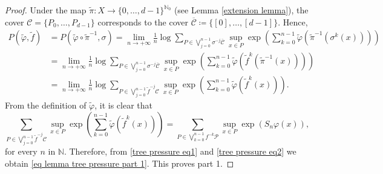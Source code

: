 \documentclass[12pt]{amsart}
\numberwithin{equation}{section} %
\numberwithin{figure}{section} %
\theoremstyle{plain}
\theoremstyle{definition}
\theoremstyle{remark}
\theoremstyle{citing}
\newcommand{\N}{\mathbb{N}}
\renewcommand{\=}{\coloneqq}
\begin{document}
\begin{proof}
    Under the map $\widetilde{\pi}: X\to\{0,\dots,d-1\}^{\N_0}$ (see Lemma \ref{extension lemma}), the cover $\mathcal{C}=\{P_0,\ldots,P_{d-1}\}$ corresponds to the cover $\overline{\mathcal{C}}\=\{[0],\ldots, [d-1]\}$. 
Hence,
\begin{equation}\label{tree pressure eq2}
\begin{split}
    P(\widetilde{\varphi},\widetilde{f}) &= P(\widetilde{\varphi}\circ \widetilde{\pi}^{-1},\sigma ) = \lim_{n\to+\infty}\frac{1}{n}\log \sum_{P\in \bigvee_{j=0}^{n-1}\sigma^{-j}\overline{\mathcal{C}}} \sup_{x\in P}\exp\left(\sum_{k=0}^{n-1} \widetilde{\varphi}(\widetilde{\pi}^{-1}(\sigma^k(x)))\right) \\
    &=\lim_{n\to+\infty}\frac{1}{n}\log \sum_{P\in \bigvee_{j=0}^{n-1}\sigma^{-j}\overline{\mathcal{C}}} \sup_{x\in P}\exp\left(\sum_{k=0}^{n-1}\widetilde{\varphi}(\widetilde{f}^k(\widetilde{\pi}^{-1}(x)))\right)\\
    &= \lim_{n\to+\infty}\frac{1}{n}\log \sum_{P\in\bigvee_{j=0}^{n-1}\widetilde{f}^{-j}\mathcal{C}} \sup_{x\in P} \exp\left(\sum_{k=0}^{n-1} \widetilde{\varphi}(\widetilde{f}^k(x))\right).
    \end{split}
\end{equation}
From the definition of $\widetilde{\varphi}$, it is clear that 
\begin{equation*}
\sum_{P\in\bigvee_{j=0}^{n-1}\widetilde{f}^{-j}\mathcal{C}} \sup_{x\in P} \exp\left(\sum_{k=0}^{n-1} \widetilde{\varphi}(\widetilde{f}^k(x))\right) =  \sum_{P\in \bigvee_{k=0}^{n-1}f^{-k} \mathcal{P}} \sup_{x\in P}\exp(S_n\varphi(x)),
\end{equation*}
for every $n$ in $\N$. Therefore, from \eqref{tree pressure eq1} and \eqref{tree pressure eq2} we obtain \eqref{eq lemma tree pressure part 1}. This proves part 1.


\end{proof}
\end{document}
